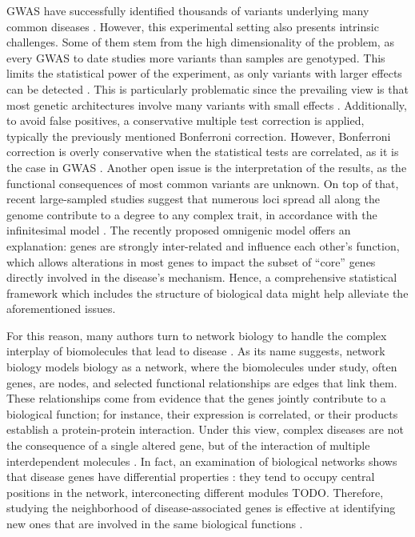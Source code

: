 \documentclass[10pt,letterpaper]{article}
\begin{document}
GWAS have successfully identified thousands of variants underlying many common diseases \cite{buniello_nhgri-ebi_2019}. However, this experimental setting also presents intrinsic challenges. Some of them stem from the high dimensionality of the problem, as every GWAS to date studies more variants than samples are genotyped. This limits the statistical power of the experiment, as only variants with larger effects can be detected \cite{visscher_10_2017}. This is particularly problematic since the prevailing view is that most genetic architectures involve many variants with small effects \cite{visscher_10_2017}. Additionally, to avoid false positives, a conservative multiple test correction is applied, typically the previously mentioned Bonferroni correction. However, Bonferroni correction is overly conservative when the statistical tests are correlated, as it is the case in GWAS \cite{wang_statistical_2018}. Another open issue is the interpretation of the results, as the functional consequences of most common variants are unknown. On top of that, recent large-sampled studies suggest that numerous loci spread all along the genome contribute to a degree to any complex trait, in accordance with the infinitesimal model \cite{barton_infinitesimal_2017}. The recently proposed omnigenic model \cite{boyle_expanded_2017} offers an explanation: genes are strongly inter-related and influence each other's function, which allows alterations in most genes to impact the subset of ``core'' genes directly involved in the disease's mechanism. Hence, a comprehensive statistical framework which includes the structure of biological data might help alleviate the aforementioned issues.

For this reason, many authors turn to network biology to handle the complex interplay of biomolecules that lead to disease \cite{furlong_human_2013}. As its name suggests, network biology models biology as a network, where the biomolecules under study, often genes, are nodes, and selected functional relationships are edges that link them. These relationships come from evidence that the genes jointly contribute to a biological function; for instance, their expression is correlated, or their products establish a protein-protein interaction. Under this view, complex diseases are not the consequence of a single altered gene, but of the interaction of multiple interdependent molecules \cite{barabasi_network_2011}. In fact, an examination of biological networks shows that disease genes have differential properties \cite{barabasi_network_2011,pinero_uncovering_2016}: they tend to occupy central positions in the network, interconecting different modules TODO. Therefore, studying the neighborhood of disease-associated genes is effective at identifying new ones that are involved in the same biological functions \cite{huang_systematic_2018}. 
\end{document}

